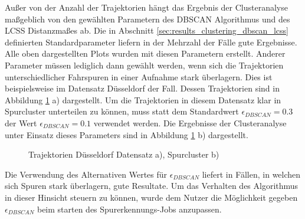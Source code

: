 Außer von der Anzahl der Trajektorien hängt das Ergebnis der Clusteranalyse maßgeblich von den gewählten
Parametern des DBSCAN Algorithmus und des LCSS Distanzmaßes ab. Die in Abschnitt \ref{sec:results_clustering_dbscan_lcss} definierten
Standardparameter liefern in der Mehrzahl der Fälle gute Ergebnisse. Alle oben dargestellten Plots
wurden mit diesen Parametern erstellt.
Anderer Parameter müssen lediglich dann gewählt werden, wenn sich die Trajektorien unterschiedlicher
Fahrspuren in einer Aufnahme stark überlagern.
Dies ist beispielsweise im Datensatz Düsseldorf der Fall. Dessen Trajektorien sind in Abbildung \ref{fig:results_clusters_duesseldorf} a) dargestellt.
Um die Trajektorien in diesem Datensatz klar in Spurcluster unterteilen zu können, muss statt dem Standardwert
$\epsilon_{DBSCAN} = 0.3$ der Wert $\epsilon_{DBSCAN} = 0.1$ verwendet werden. Die Ergebnisse der Clusteranalyse
unter Einsatz dieses Parameters sind in Abbildung \ref{fig:results_clusters_duesseldorf} b) dargestellt.

\begin{figure}[H]
    \centering
    \qquad \qquad
    \caption{Trajektorien Düsseldorf Datensatz a), Spurcluster b)}
    \label{fig:results_clusters_duesseldorf}
\end{figure}

Die Verwendung des Alternativen Wertes für $\epsilon_{DBSCAN}$ liefert in Fällen, in welchen sich Spuren stark überlagern,
gute Resultate. Um das Verhalten des Algorithmus in dieser Hinsicht steuern zu können, wurde dem Nutzer die Möglichkeit
gegeben $\epsilon_{DBSCAN}$ beim starten des Spurerkennungs-Jobs anzupassen.

